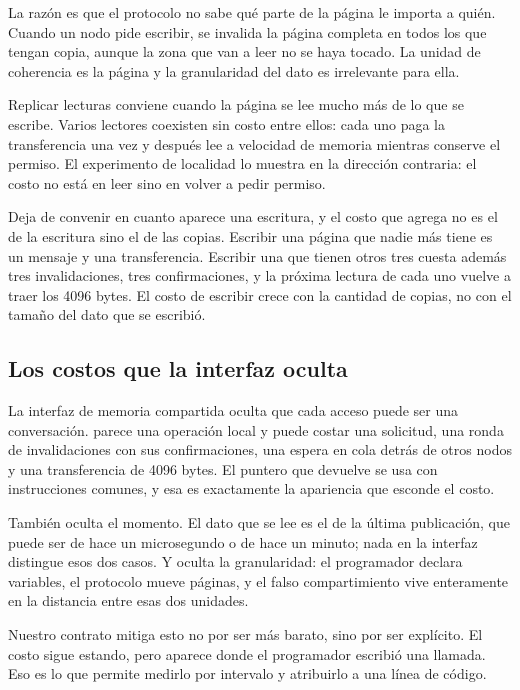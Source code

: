 La razón es que el protocolo no sabe qué parte de la página le importa a
quién. Cuando un nodo pide escribir, se invalida la página completa en todos
los que tengan copia, aunque la zona que van a leer no se haya tocado. La
unidad de coherencia es la página y la granularidad del dato es irrelevante
para ella.

Replicar lecturas conviene cuando la página se lee mucho más de lo que se
escribe. Varios lectores coexisten sin costo entre ellos: cada uno paga la
transferencia una vez y después lee a velocidad de memoria mientras conserve
el permiso. El experimento de localidad lo muestra en la dirección contraria:
el costo no está en leer sino en volver a pedir permiso.

Deja de convenir en cuanto aparece una escritura, y el costo que agrega no es
el de la escritura sino el de las copias. Escribir una página que nadie más
tiene es un mensaje y una transferencia. Escribir una que tienen otros tres
cuesta además tres invalidaciones, tres confirmaciones, y la próxima lectura
de cada uno vuelve a traer los 4096 bytes. El costo de escribir crece con la
cantidad de copias, no con el tamaño del dato que se escribió.

\subsection{Los costos que la interfaz oculta}

La interfaz de memoria compartida oculta que cada acceso puede ser una
conversación.  parece una operación local y puede costar
una solicitud, una ronda de invalidaciones con sus confirmaciones, una espera
en cola detrás de otros nodos y una transferencia de 4096 bytes. El puntero
que devuelve se usa con instrucciones comunes, y esa es exactamente la
apariencia que esconde el costo.

También oculta el momento. El dato que se lee es el de la última publicación,
que puede ser de hace un microsegundo o de hace un minuto; nada en la interfaz
distingue esos dos casos. Y oculta la granularidad: el programador declara
variables, el protocolo mueve páginas, y el falso compartimiento vive
enteramente en la distancia entre esas dos unidades.

Nuestro contrato mitiga esto no por ser más barato, sino por ser explícito. El
costo sigue estando, pero aparece donde el programador escribió una llamada.
Eso es lo que permite medirlo por intervalo y atribuirlo a una línea de
código.

